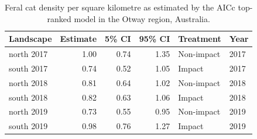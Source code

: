\documentclass[preprint, 3p, authoryear]{elsarticle} %
\begin{document}
\begingroup\fontsize{10}{12}\selectfont

\begin{longtable}[t]{lrrrll}
\caption{\label{tab:density-aic-o-5}Feral cat density per square kilometre as estimated by the AICc top-ranked model in the Otway region, Australia.}\\
\toprule
Landscape & Estimate & 5\% CI & 95\% CI & Treatment & Year\\
\midrule
north 2017 & 1.00 & 0.74 & 1.35 & Non-impact & 2017\\
south 2017 & 0.74 & 0.52 & 1.05 & Impact & 2017\\
north 2018 & 0.81 & 0.64 & 1.02 & Non-impact & 2018\\
south 2018 & 0.82 & 0.63 & 1.06 & Impact & 2018\\
north 2019 & 0.73 & 0.55 & 0.95 & Non-impact & 2019\\
\addlinespace
south 2019 & 0.98 & 0.76 & 1.27 & Impact & 2019\\
\bottomrule
\end{longtable}
\endgroup{}
\end{document}
